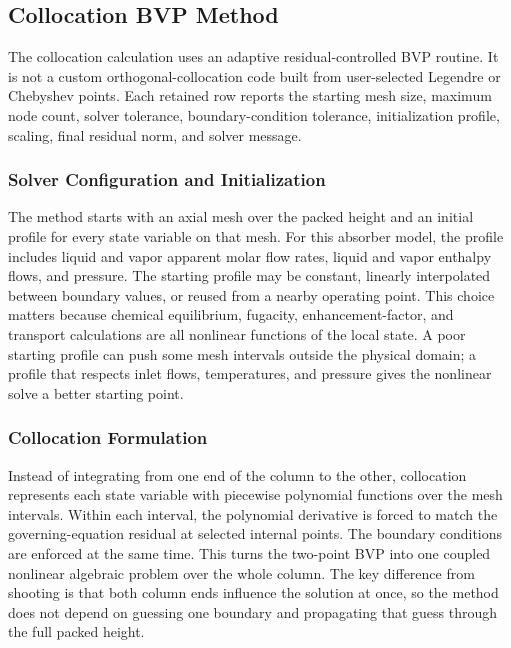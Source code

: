         \subsection{Collocation BVP Method}
            The collocation calculation uses an adaptive residual-controlled BVP routine. It is not a custom orthogonal-collocation code built from user-selected Legendre or Chebyshev points. Each retained row reports the starting mesh size, maximum node count, solver tolerance, boundary-condition tolerance, initialization profile, scaling, final residual norm, and solver message.

            \subsubsection*{Solver Configuration and Initialization}
                The method starts with an axial mesh over the packed height and an initial profile for every state variable on that mesh. For this absorber model, the profile includes liquid and vapor apparent molar flow rates, liquid and vapor enthalpy flows, and pressure. The starting profile may be constant, linearly interpolated between boundary values, or reused from a nearby operating point. This choice matters because chemical equilibrium, fugacity, enhancement-factor, and transport calculations are all nonlinear functions of the local state. A poor starting profile can push some mesh intervals outside the physical domain; a profile that respects inlet flows, temperatures, and pressure gives the nonlinear solve a better starting point.

            \subsubsection*{Collocation Formulation}
                Instead of integrating from one end of the column to the other, collocation represents each state variable with piecewise polynomial functions over the mesh intervals. Within each interval, the polynomial derivative is forced to match the governing-equation residual at selected internal points. The boundary conditions are enforced at the same time. This turns the two-point BVP into one coupled nonlinear algebraic problem over the whole column. The key difference from shooting is that both column ends influence the solution at once, so the method does not depend on guessing one boundary and propagating that guess through the full packed height.

